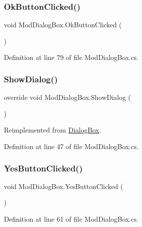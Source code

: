 \subsubsection{\texorpdfstring{Ok\+Button\+Clicked()}{OkButtonClicked()}}
{\footnotesize\ttfamily void Mod\+Dialog\+Box.\+Ok\+Button\+Clicked (\begin{DoxyParamCaption}{ }\end{DoxyParamCaption})}



Definition at line 79 of file Mod\+Dialog\+Box.\+cs.

\mbox{\label{class_mod_dialog_box_aaeae20aeb93688e1acc1cce9e9965c48}} 
\subsubsection{\texorpdfstring{Show\+Dialog()}{ShowDialog()}}
{\footnotesize\ttfamily override void Mod\+Dialog\+Box.\+Show\+Dialog (\begin{DoxyParamCaption}{ }\end{DoxyParamCaption})\hspace{0.3cm}{\ttfamily [virtual]}}



Reimplemented from \hyperlink{class_dialog_box_a971a6e45f6ca26863c3910680521b0ac}{Dialog\+Box}.



Definition at line 47 of file Mod\+Dialog\+Box.\+cs.

\mbox{\label{class_mod_dialog_box_ab00d02799425cfe3f59bbb156956acbc}} 
\subsubsection{\texorpdfstring{Yes\+Button\+Clicked()}{YesButtonClicked()}}
{\footnotesize\ttfamily void Mod\+Dialog\+Box.\+Yes\+Button\+Clicked (\begin{DoxyParamCaption}{ }\end{DoxyParamCaption})}



Definition at line 61 of file Mod\+Dialog\+Box.\+cs.



